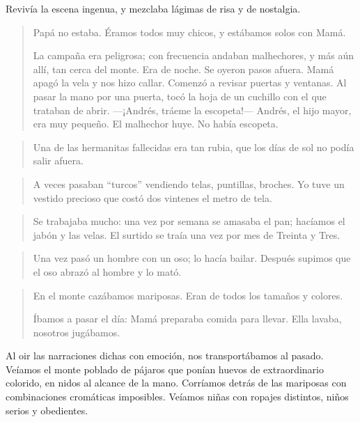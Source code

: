 \documentclass[a4paper]{article}
\begin{document}
Revivía la escena ingenua, y mezclaba lágimas de risa y de nostalgia.

\begin{quote}
    Papá no estaba. Éramos todos muy chicos, y estábamos solos con Mamá.

    La campaña era peligrosa; con frecuencia andaban malhechores, y más aún allí, tan cerca del monte. Era de noche. Se oyeron pasos afuera. Mamá apagó la vela y nos hizo callar. Comenzó a revisar puertas y ventanas. Al pasar la mano por una puerta, tocó la hoja de un cuchillo con el que trataban de abrir. ---¡Andrés, tráeme la escopeta!--- Andrés, el hijo mayor, era muy pequeño. El malhechor huye. No había escopeta.
\end{quote}

\begin{quote}
    Una de las hermanitas fallecidas era tan rubia, que los días de sol no podía salir afuera.
\end{quote}

\begin{quote}
    A veces pasaban ``turcos'' vendiendo telas, puntillas, broches. Yo tuve un vestido precioso que costó dos vintenes el metro de tela.
\end{quote}

\begin{quote}
    Se trabajaba mucho: una vez por semana se amasaba el pan; ha\-cí\-amos el jabón y las velas. El surtido se traía una vez por mes de Treinta y Tres.
\end{quote}

\begin{quote}
    Una vez pasó un hombre con un oso; lo hacía bailar. Después supimos que el oso abrazó al hombre y lo mató.
\end{quote}

\begin{quote}
    En el monte cazábamos mariposas. Eran de todos los tamaños y colores.

    Íbamos a pasar el día: Mamá preparaba comida para llevar. Ella lavaba, nosotros jugábamos.
\end{quote}

Al oir las narraciones dichas con emoción, nos transportábamos al pasado. Veíamos el monte poblado de pájaros que ponían huevos de extraordinario colorido, en nidos al alcance de la mano. Corríamos detrás de las mariposas con combinaciones cromáticas imposibles. Veíamos niñas con ropajes distintos, niños serios y obedientes.
\end{document}
